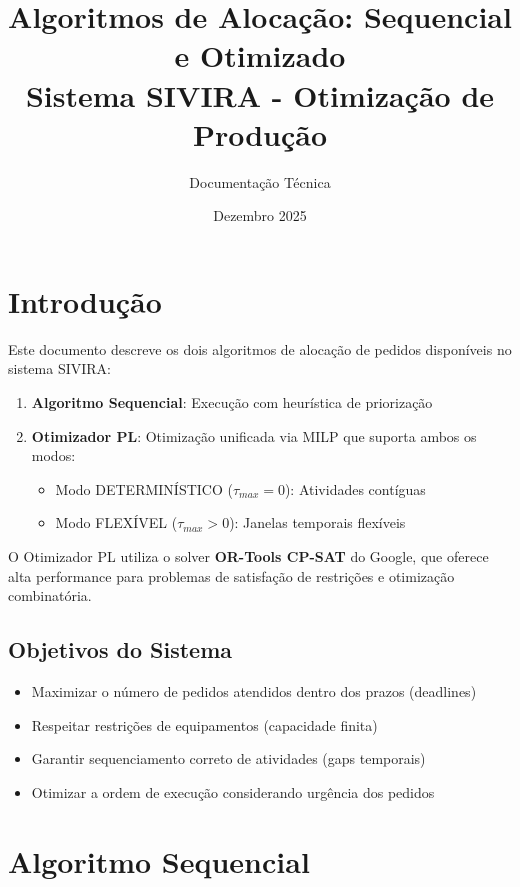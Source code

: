 \documentclass[12pt,a4paper]{article}
\title{\textbf{Algoritmos de Alocação: Sequencial e Otimizado}\\
\large Sistema SIVIRA - Otimização de Produção}
\author{Documentação Técnica}
\date{Dezembro 2025}
\begin{document}
\maketitle

\tableofcontents
\newpage

\section{Introdução}

Este documento descreve os dois algoritmos de alocação de pedidos disponíveis no sistema SIVIRA:

\begin{enumerate}
    \item \textbf{Algoritmo Sequencial}: Execução com heurística de priorização
    \item \textbf{Otimizador PL}: Otimização unificada via MILP que suporta ambos os modos:
    \begin{itemize}
        \item Modo DETERMINÍSTICO ($\tau_{max} = 0$): Atividades contíguas
        \item Modo FLEXÍVEL ($\tau_{max} > 0$): Janelas temporais flexíveis
    \end{itemize}
\end{enumerate}

O Otimizador PL utiliza o solver \textbf{OR-Tools CP-SAT} do Google, que oferece alta performance para problemas de satisfação de restrições e otimização combinatória.

\subsection{Objetivos do Sistema}

\begin{itemize}
    \item Maximizar o número de pedidos atendidos dentro dos prazos (deadlines)
    \item Respeitar restrições de equipamentos (capacidade finita)
    \item Garantir sequenciamento correto de atividades (gaps temporais)
    \item Otimizar a ordem de execução considerando urgência dos pedidos
\end{itemize}

\section{Algoritmo Sequencial}
\end{document}
